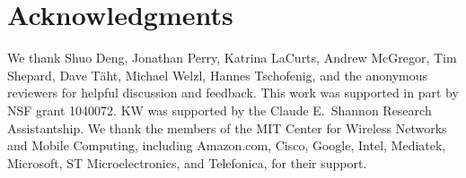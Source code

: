 \section{Acknowledgments}
\label{s:acks}

We thank Shuo Deng, Jonathan Perry, Katrina LaCurts, Andrew McGregor,
Tim Shepard, Dave T\"{a}ht, Michael Welzl, Hannes Tschofenig, and the
anonymous reviewers for helpful discussion and feedback. This work was
supported in part by NSF grant 1040072. KW was supported by the Claude
E.~Shannon Research Assistantship. We thank the members of the MIT
Center for Wireless Networks and Mobile Computing, including
Amazon.com, Cisco, Google, Intel, Mediatek, Microsoft, ST
Microelectronics, and Telefonica, for their support.
